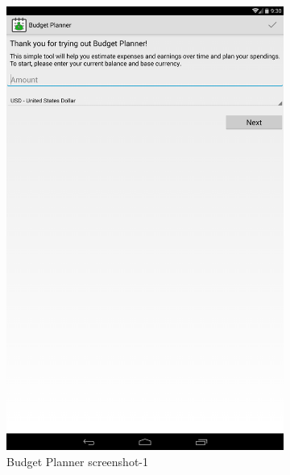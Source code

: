 \begin{figure}[h]
	\centering
	\begin{subfigure}[h]{0.45\textwidth}
		\centering
		\includegraphics[width=\textwidth]{bp1.png}
		\caption{Budget Planner screenshot-1}
	\end{subfigure}
	\hfill
	\begin{subfigure}[h]{0.45\textwidth}
		\centering

\end{subfigure}
\end{figure}
